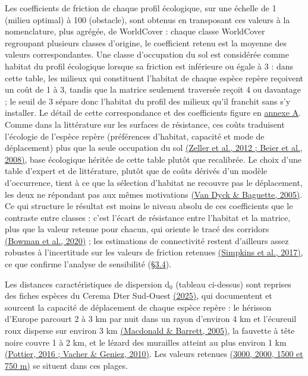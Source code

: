 \documentclass[a4paper,11pt]{report}
\begin{document}
Les coefficients de friction de chaque profil écologique, sur une échelle de 1 (milieu optimal) à 100 (obstacle), sont obtenus en transposant ces valeurs à la nomenclature, plus agrégée, de WorldCover : chaque classe WorldCover regroupant plusieurs classes d'origine, le coefficient retenu est la moyenne des valeurs correspondantes. Une classe d'occupation du sol est considérée comme habitat du profil écologique lorsque sa friction est inférieure ou égale à 3 : dans cette table, les milieux qui constituent l'habitat de chaque espèce repère reçoivent un coût de 1 à 3, tandis que la matrice seulement traversée reçoit 4 ou davantage ; le seuil de 3 sépare donc l'habitat du profil des milieux qu'il franchit sans s'y installer. Le détail de cette correspondance et des coefficients figure en \hyperref[annexe:A]{annexe A}. Comme dans la littérature sur les surfaces de résistance, ces coûts traduisent l'écologie de l'espèce repère (préférences d'habitat, capacité et mode de déplacement) plus que la seule occupation du sol \hyperref[sec:bibliographie]{(Zeller et al., 2012 ; Beier et al., 2008)}, base écologique héritée de cette table plutôt que recalibrée. Le choix d'une table d'expert et de littérature, plutôt que de coûts dérivés d'un modèle d'occurrence, tient à ce que la sélection d'habitat ne recouvre pas le déplacement, les deux ne répondant pas aux mêmes motivations \hyperref[sec:bibliographie]{(Van Dyck \& Baguette, 2005)}. Ce qui structure le résultat est moins le niveau absolu de ces coefficients que le contraste entre classes : c'est l'écart de résistance entre l'habitat et la matrice, plus que la valeur retenue pour chacun, qui oriente le tracé des corridors \hyperref[sec:bibliographie]{(Bowman et al., 2020)} ; les estimations de connectivité restent d'ailleurs assez robustes à l'incertitude sur les valeurs de friction retenues \hyperref[sec:bibliographie]{(Simpkins et al., 2017)}, ce que confirme l'analyse de sensibilité (\hyperref[sec:3.4]{§3.4}).

Les distances caractéristiques de dispersion d$_{0}$ (tableau ci-dessus) sont reprises des fiches espèces du Cerema Dter Sud-Ouest \hyperref[sec:bibliographie]{(2025)}, qui documentent et sourcent la capacité de déplacement de chaque espèce repère : le hérisson d'Europe parcourt 2 à 3 km par nuit dans un rayon d'environ 4 km et l'écureuil roux disperse sur environ 3 km \hyperref[sec:bibliographie]{(Macdonald \& Barrett, 2005)}, la fauvette à tête noire couvre 1 à 2 km, et le lézard des murailles atteint au plus environ 1 km \hyperref[sec:bibliographie]{(Pottier, 2016 ; Vacher \& Geniez, 2010)}. Les valeurs retenues \hyperref[sec:bibliographie]{(3000, 2000, 1500 et 750 m)} se situent dans ces plages.
\end{document}
